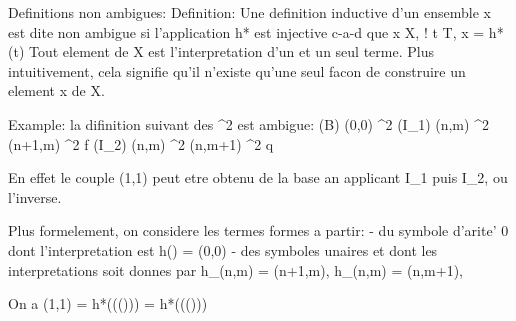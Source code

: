 \documentclass{article}
\begin{document}
Definitions non ambigues:
Definition: Une definition inductive d'un ensemble x est dite non ambigue si l'application h* est injective c-a-d que \forall x \in X, \exists! t \in T, x = h*(t)
Tout element de X est l'interpretation d'un et un seul terme.
Plus intuitivement, cela signifie qu'il n'existe qu'une seul facon de construire un element x de X.

Example: la difinition suivant des \N^2 est ambigue:
(B) (0,0) \in \N^2
(I_1) (n,m) \in \N^2 \rightarrow (n+1,m) \in \N^2 f
(I_2) (n,m) \in \N^2 \rightarrow (n,m+1) \in \N^2 q

En effet le couple (1,1) peut etre obtenu de la base an applicant I_1 puis I_2, ou l'inverse.


Plus formelement, on considere les termes formes a partir:
- du symbole  d'arite' 0 dont l'interpretation est h() = (0,0)
- des symboles unaires  et  dont les interpretations soit donnes par 
h_{}(n,m) = (n+1,m), h_{}(n,m) = (n,m+1),

On a (1,1) = h*((())) = h*((()))
\end{document}
